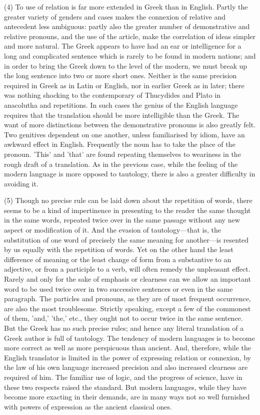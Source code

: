 \documentclass[11pt,letter]{article}
\begin{document}
\par  (4) To use of relation is far more extended in Greek than in English. Partly the greater variety of genders and cases makes the connexion of relative and antecedent less ambiguous: partly also the greater number of demonstrative and relative pronouns, and the use of the article, make the correlation of ideas simpler and more natural. The Greek appears to have had an ear or intelligence for a long and complicated sentence which is rarely to be found in modern nations; and in order to bring the Greek down to the level of the modern, we must break up the long sentence into two or more short ones. Neither is the same precision required in Greek as in Latin or English, nor in earlier Greek as in later; there was nothing shocking to the contemporary of Thucydides and Plato in anacolutha and repetitions. In such cases the genius of the English language requires that the translation should be more intelligible than the Greek. The want of more distinctions between the demonstrative pronouns is also greatly felt. Two genitives dependent on one another, unless familiarised by idiom, have an awkward effect in English. Frequently the noun has to take the place of the pronoun. 'This' and 'that' are found repeating themselves to weariness in the rough draft of a translation. As in the previous case, while the feeling of the modern language is more opposed to tautology, there is also a greater difficulty in avoiding it.

\par  (5) Though no precise rule can be laid down about the repetition of words, there seems to be a kind of impertinence in presenting to the reader the same thought in the same words, repeated twice over in the same passage without any new aspect or modification of it. And the evasion of tautology—that is, the substitution of one word of precisely the same meaning for another—is resented by us equally with the repetition of words. Yet on the other hand the least difference of meaning or the least change of form from a substantive to an adjective, or from a participle to a verb, will often remedy the unpleasant effect. Rarely and only for the sake of emphasis or clearness can we allow an important word to be used twice over in two successive sentences or even in the same paragraph. The particles and pronouns, as they are of most frequent occurrence, are also the most troublesome. Strictly speaking, except a few of the commonest of them, 'and,' 'the,' etc., they ought not to occur twice in the same sentence. But the Greek has no such precise rules; and hence any literal translation of a Greek author is full of tautology. The tendency of modern languages is to become more correct as well as more perspicuous than ancient. And, therefore, while the English translator is limited in the power of expressing relation or connexion, by the law of his own language increased precision and also increased clearness are required of him. The familiar use of logic, and the progress of science, have in these two respects raised the standard. But modern languages, while they have become more exacting in their demands, are in many ways not so well furnished with powers of expression as the ancient classical ones.
\end{document}
